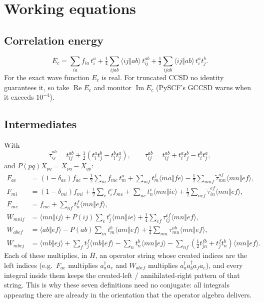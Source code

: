 \documentclass[11pt]{article}
\newcommand{\anti}[4]{\langle #1#2\Vert #3#4\rangle}
\begin{document}
\section{Working equations}

\subsection{Correlation energy}

\begin{equation}
E_c=\sum_{ia}f_{ia}\,t_i^a+\tfrac14\sum_{ijab}\anti{i}{j}{a}{b}\,t_{ij}^{ab}
+\tfrac12\sum_{ijab}\anti{i}{j}{a}{b}\,t_i^a t_j^b .
\end{equation}
For the exact wave function $E_c$ is real. For truncated CCSD no identity
guarantees it, so take $\operatorname{Re}E_c$ and monitor
$\operatorname{Im}E_c$ (PySCF's GCCSD warns when it exceeds $10^{-4}$).

\subsection{Intermediates}

With
\begin{equation}
\tilde\tau_{ij}^{ab}=t_{ij}^{ab}+\tfrac12\left(t_i^a t_j^b-t_i^b t_j^a\right),\qquad
\tau_{ij}^{ab}=t_{ij}^{ab}+t_i^a t_j^b-t_i^b t_j^a ,
\end{equation}
and $P(pq)X_{pq}=X_{pq}-X_{qp}$:
\begin{align}
F_{ae} &= (1-\delta_{ae})f_{ae}-\tfrac12\sum_m f_{me}\,t_m^a
 +\sum_{mf}t_m^f\anti{m}{a}{f}{e}
 -\tfrac12\sum_{mnf}\tilde\tau_{mn}^{af}\anti{m}{n}{e}{f},\\
F_{mi} &= (1-\delta_{mi})f_{mi}+\tfrac12\sum_e t_i^e f_{me}
 +\sum_{ne}t_n^e\anti{m}{n}{i}{e}
 +\tfrac12\sum_{nef}\tilde\tau_{in}^{ef}\anti{m}{n}{e}{f},\\
F_{me} &= f_{me}+\sum_{nf}t_n^f\anti{m}{n}{e}{f},\\
W_{mnij} &= \anti{m}{n}{i}{j}+P(ij)\sum_e t_j^e\anti{m}{n}{i}{e}
 +\tfrac14\sum_{ef}\tau_{ij}^{ef}\anti{m}{n}{e}{f},\\
W_{abef} &= \anti{a}{b}{e}{f}-P(ab)\sum_m t_m^b\anti{a}{m}{e}{f}
 +\tfrac14\sum_{mn}\tau_{mn}^{ab}\anti{m}{n}{e}{f},\\
W_{mbej} &= \anti{m}{b}{e}{j}+\sum_f t_j^f\anti{m}{b}{e}{f}
 -\sum_n t_n^b\anti{m}{n}{e}{j}
 -\sum_{nf}\left(\tfrac12 t_{jn}^{fb}+t_j^f t_n^b\right)\anti{m}{n}{e}{f}.
\end{align}
Each of these multiplies, in $\bar H$, an operator string whose created
indices are the left indices (e.g.\ $F_{ae}$ multiplies $a_a^\dagger a_e$ and
$W_{abef}$ multiplies $a_a^\dagger a_b^\dagger a_f a_e$), and every
integral inside them keeps the created-left / annihilated-right pattern of
that string. This is why these seven definitions need no conjugate: all
integrals appearing there are already in the orientation that the operator
algebra delivers.
\end{document}
